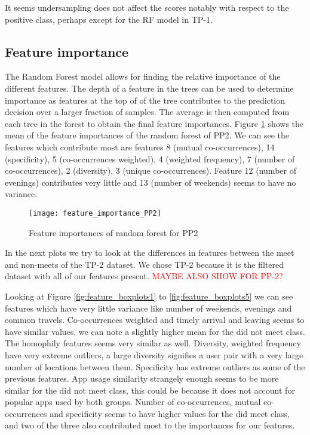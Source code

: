 It seems undersampling does not affect the scores notably with respect to the positive class, perhaps except for the RF model in TP-1.

\subsection{Feature importance}
The Random Forest model allows for finding the relative importance of the different features. The depth of a feature in the trees can be used to determine importance as features at the top of of the tree contributes to the prediction decision over a larger fraction of samples. The average is then computed from each tree in the forest to obtain the final feature importances.
Figure \ref{fig:feature_importances} shows the mean of the feature importances of the random forest of PP2. We can see the features which contribute most are features 8 (mutual co-occurrences), 14 (specificity), 5 (co-occurrences weighted), 4 (weighted frequency), 7 (number of co-occurrences), 2 (diversity), 3 (unique co-occurrences). Feature 12 (number of evenings) contributes very little and 13 (number of weekends) seems to have no variance.
\begin{figure}[H]
    \hspace*{-1.0cm}
    \centering
    \texttt{[image: feature\_importance\_PP2]}
    \caption{Feature importances of random forest for PP2}
    \label{fig:feature_importances}
\end{figure}

In the next plots we try to look at the differences in features between the meet and non-meets of the TP-2 dataset. We chose TP-2 because it is the filtered dataset with all of our features present. \textcolor{red}{MAYBE ALSO SHOW FOR PP-2?}

Looking at Figure \ref{fig:feature_boxplots1} to \ref{fig:feature_boxplots5} we can see features which have very little variance like number of weekends, evenings and common travels. Co-occurrences weighted and timely arrival and leaving seems to have similar values, we can note a slightly higher mean for the did not meet class. The homophily features seems very similar as well. Diversity, weighted frequency have very extreme outliers, a large diversity signifies a user pair with a very large number of locations between them. Specificity has extreme outliers as some of the previous features. App usage similarity strangely enough seems to be more similar for the did not meet class, this could be because it does not account for popular apps used by both groups. Number of co-occurrences, mutual co-occurrences and specificity seems to have higher values for the did meet class, and two of the three also contributed most to the importances for our features.

